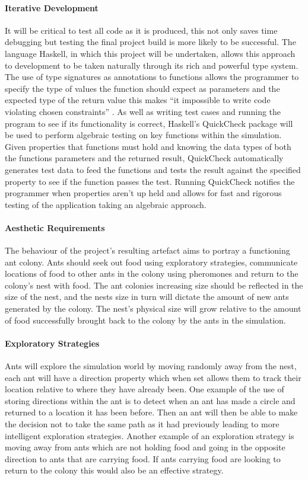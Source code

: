 \documentclass[main.tex]{subfiles}
\begin{document}
\paragraph{Iterative Development} It will be critical to test all code as it is produced, this not only saves time debugging but testing the final project build is more likely to be successful. The language Haskell, in which this project will be undertaken, allows this approach to development to be taken naturally through its rich and powerful type system. The use of type signatures as annotations to functions allows the programmer to specify the type of values the function should expect as parameters and the expected type of the return value this makes ``it impossible to write code violating chosen constraints'' \cite{OSullivan2008}. As well as writing test cases and running the program to see if its functionality is correct, Haskell's QuickCheck package will be used to perform algebraic testing on key functions within the simulation. Given properties that functions must hold and knowing the data types of both the functions parameters and the returned result, QuickCheck automatically generates test data to feed the functions and tests the result against the specified property to see if the function passes the test. Running QuickCheck notifies the programmer when properties aren't up held and allows for fast and rigorous testing of the application taking an algebraic approach.

\paragraph{Aesthetic Requirements}
The behaviour of the project's resulting artefact aims to portray a functioning ant colony. Ants should seek out food using exploratory strategies, communicate locations of food to other ants in the colony using pheromones and return to the colony's nest with food. The ant colonies increasing size should be reflected in the size of the nest, and the nests size in turn will dictate the amount of new ants generated by the colony. The nest's physical size will grow relative to the amount of food successfully brought back to the colony by the ants in the simulation.

\paragraph{Exploratory Strategies} Ants will explore the simulation world by moving randomly away from the nest, each ant will have a direction property which when set allows them to track their location relative to where they have already been. One example of the use of storing directions within the ant is to detect when an ant has made a circle and returned to a location it has been before. Then an ant will then be able to make the decision not to take the same path as it had previously leading to more intelligent exploration strategies. Another example of an exploration strategy is moving away from ants which are not holding food and going in the opposite direction to ants that are carrying food. If ants carrying food are looking to return to the colony this would also be an effective strategy.
\end{document}
